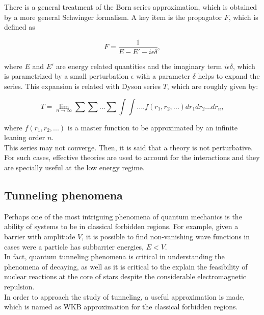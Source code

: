 \documentclass[openany]{book}
\begin{document}
There is a general treatment of the Born series approximation, which is obtained by a more general Schwinger formalism. A key item is the propagator $F$, which is defined as 

\begin{equation}\label{eq:bornApproximation_propagator}
	F = \frac{1}{E - E' - i \epsilon \delta},
\end{equation}

where $E$ and $E'$ are energy related quantities and the imaginary term  $i \epsilon \delta$, which is parametrized by a small perturbation $\epsilon$ with a parameter $\delta$ helps to expand the series. This expansion is related with Dyson series $T$, which are roughly given by:

 \begin{equation}\label{eq:bornApproximation_DysonSeries}
 	T = \lim_{n\rightarrow\infty} \sum \sum ... \sum \int \int .... f(r_1, r_2, ...) dr_1 dr_2 ... dr_n,
 \end{equation}

where $f(r_1, r_2, ...) $ is a master function to be approximated by an infinite leaning order $n$. \\

This series may not converge. Then, it is said that a theory is not perturbative. For such cases, effective theories are used to account for the interactions and they are specially useful at the low energy regime. 


\subsection{Tunneling phenomena} \label{sub:tunnelingPhenomena}

Perhaps one of the most intriguing phenomena of quantum mechanics is the ability of systems to be in classical forbidden regions. For example, given a barrier with amplitude $V$, it is possible to find non-vanishing wave functions in cases were a particle has subbarrier energies, $E < V$. \\

In fact, quantum tunneling phenomena is critical in understanding the phenomena of decaying, as well as it is critical to the explain the feasibility of nuclear reactions at the core of stars despite the considerable electromagnetic repulsion. \\

In order to approach the study of tunneling, a useful approximation is made, which is named as WKB approximation for the classical forbidden regions. \\
\end{document}
